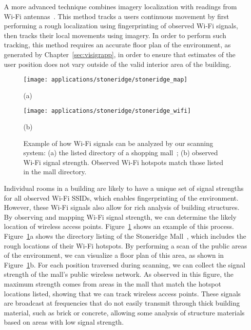 \documentclass[12pt,onecolumn,oneside]{book}
\begin{document}
A more advanced technique combines imagery localization with readings from Wi-Fi antennas~\cite{Levchev14}.  This method tracks a users continuous movement by first performing a rough localization using fingerprinting of observed Wi-Fi signals, then tracks their local movements using imagery.  In order to perform such tracking, this method requires an accurate floor plan of the environment, as generated by Chapter~\ref{sec:visigrapp}, in order to ensure that estimates of the user position does not vary outside of the valid interior area of the building.

\begin{figure}[t]

	\begin{minipage}[t]{0.49\linewidth}
		\centerline{\texttt{[image: applications/stoneridge/stoneridge\_map]}}
		\centerline{(a)}
	\end{minipage}
	\hfill
	\begin{minipage}[t]{0.49\linewidth}
		\centerline{\texttt{[image: applications/stoneridge/stoneridge\_wifi]}}
		\centerline{(b)}
	\end{minipage}
	
	\caption[Analysis of Wi-Fi signals in scans.]{Example of how Wi-Fi signals can be analyzed by our scanning system: (a) the listed directory of a shopping mall~\cite{Stoneridge}; (b) observed Wi-Fi signal strength.  Observed Wi-Fi hotspots match those listed in the mall directory.}
	\label{fig:stoneridge_wifi}
\end{figure}

Individual rooms in a building are likely to have a unique set of signal strengths for all observed Wi-Fi SSIDs, which enables fingerprinting of the environment.  However, these Wi-Fi signals also allow for rich analysis of building structures.  By observing and mapping Wi-Fi signal strength, we can determine the likely location of wireless access points.  Figure~\ref{fig:stoneridge_wifi} shows an example of this process.  Figure~\ref{fig:stoneridge_wifi}a shows the directory listing of the Stoneridge Mall~\cite{Stoneridge}, which includes the rough locations of their Wi-Fi hotspots.  By performing a scan of the public areas of the environment, we can visualize a floor plan of this area, as shown in Figure~\ref{fig:stoneridge_wifi}b.  For each position traversed during scanning, we can collect the signal strength of the mall's public wireless network.  As observed in this figure, the maximum strength comes from areas in the mall that match the hotspot locations listed, showing that we can track wireless access points.  These signals are broadcast at frequencies that do not easily transmit through thick building material, such as brick or concrete, allowing some analysis of structure materials based on areas with low signal strength.
\end{document}
